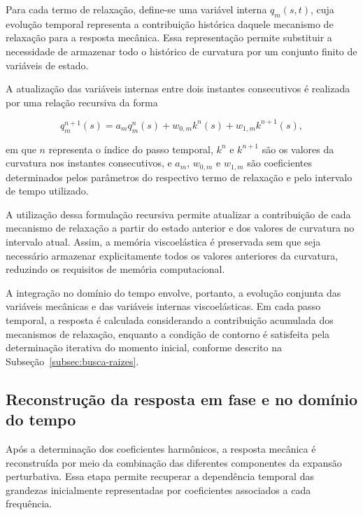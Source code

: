 \documentclass[arial,centeredequations,english,brazilian,oneside,section=TITLE]{ifes8}
\begin{document}
Para cada termo de relaxação, define-se uma variável interna
$q_m(s,t)$, cuja evolução temporal representa a contribuição
histórica daquele mecanismo de relaxação para a resposta
mecânica. Essa representação permite substituir a necessidade
de armazenar todo o histórico de curvatura por um conjunto
finito de variáveis de estado.

A atualização das variáveis internas entre dois instantes
consecutivos é realizada por uma relação recursiva da forma

\begin{equation}
  q_m^{n+1}(s)
  =
  a_m q_m^n(s)
  +
  w_{0,m}k^n(s)
  +
  w_{1,m}k^{n+1}(s),
  \label{eq:recursao-viscoelastica}
\end{equation}

em que $n$ representa o índice do passo temporal, $k^n$ e
$k^{n+1}$ são os valores da curvatura nos instantes consecutivos,
e $a_m$, $w_{0,m}$ e $w_{1,m}$ são coeficientes determinados
pelos parâmetros do respectivo termo de relaxação e pelo
intervalo de tempo utilizado.

A utilização dessa formulação recursiva permite atualizar a
contribuição de cada mecanismo de relaxação a partir do estado
anterior e dos valores de curvatura no intervalo atual. Assim,
a memória viscoelástica é preservada sem que seja necessário
armazenar explicitamente todos os valores anteriores da
curvatura, reduzindo os requisitos de memória computacional.

A integração no domínio do tempo envolve, portanto, a evolução
conjunta das variáveis mecânicas e das variáveis internas
viscoelásticas. Em cada passo temporal, a resposta é calculada
considerando a contribuição acumulada dos mecanismos de
relaxação, enquanto a condição de contorno é satisfeita pela
determinação iterativa do momento inicial, conforme descrito
na Subseção~\ref{subsec:busca-raizes}.

\subsection{Reconstrução da resposta em fase e no domínio do
tempo}
\label{subsec:reconstrucao-resposta}

Após a determinação dos coeficientes harmônicos, a resposta
mecânica é reconstruída por meio da combinação das diferentes
componentes da expansão perturbativa. Essa etapa permite
recuperar a dependência temporal das grandezas inicialmente
representadas por coeficientes associados a cada frequência.
\end{document}
